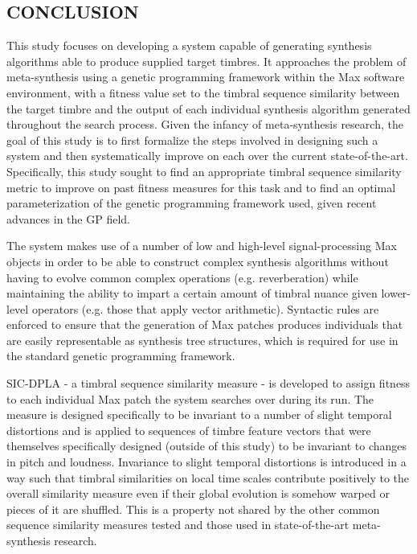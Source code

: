\documentclass[12pt]{report} 	%
\numberwithin{figure}{chapter}
\numberwithin{table}{chapter}
\numberwithin{equation}{chapter}
\begin{document}
\begin{flushleft}
\vspace*{\QuarterPage}
\chapter{CONCLUSION} %
This study focuses on developing a system capable of generating synthesis algorithms able to produce supplied target timbres. It approaches the problem of meta-synthesis using a genetic programming framework within the Max software environment, with a fitness value set to the timbral sequence similarity between the target timbre and the output of each individual synthesis algorithm generated throughout the search process. Given the infancy of meta-synthesis research, the goal of this study is to first formalize the steps involved in designing such a system and then systematically improve on each over the current state-of-the-art. Specifically, this study sought to find an appropriate timbral sequence similarity metric to improve on past fitness measures for this task and to find an optimal parameterization of the genetic programming framework used, given recent advances in the GP field.

The system makes use of a number of low and high-level signal-processing Max objects in order to be able to construct complex synthesis algorithms without having to evolve common complex operations (e.g. reverberation) while maintaining the ability to impart a certain amount of timbral nuance given lower-level operators (e.g. those that apply vector arithmetic). Syntactic rules are enforced to ensure that the generation of Max patches produces individuals that are easily representable as synthesis tree structures, which is required for use in the standard genetic programming framework.

SIC-DPLA - a timbral sequence similarity measure - is developed to assign fitness to each individual Max patch the system searches over during its run. The measure is designed specifically to be invariant to a number of slight temporal distortions and is applied to sequences of timbre feature vectors that were themselves specifically designed (outside of this study) to be invariant to changes in pitch and loudness. Invariance to slight temporal distortions is introduced in a way such that timbral similarities on local time scales contribute positively to the overall similarity measure even if their global evolution is somehow warped or pieces of it are shuffled. This is a property not shared by the other common sequence similarity measures tested and those used in state-of-the-art meta-synthesis research.


\end{flushleft}
\end{document}
